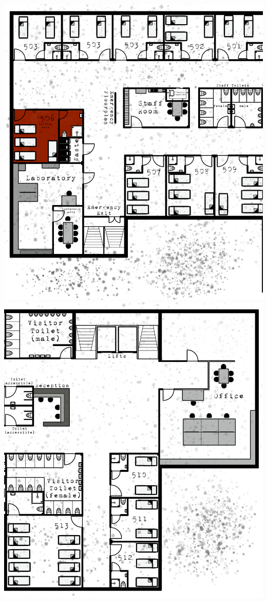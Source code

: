 \newpage
\mbox{}
\clearpage
\newpage
\onecolumn
\hspace*{-0.5cm}%
\includegraphics[width=19.5cm, keepaspectratio]{resources/img/the ward-player-L.png}
\clearpage
\onecolumn
\hspace*{-2.0cm}%
\includegraphics[width=19.5cm, keepaspectratio]{resources/img/the ward-player-R.png}
\clearpage
